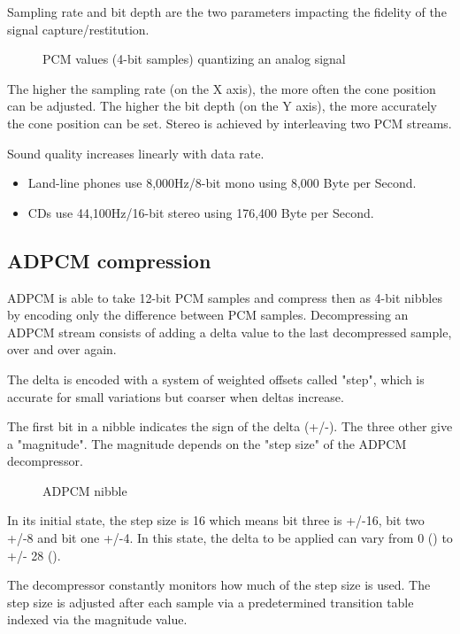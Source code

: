 Sampling rate and bit depth are the two parameters impacting the fidelity of the signal capture/restitution.

\begin{figure}[H]
\caption*{PCM values (4-bit samples) quantizing an analog signal}
\end{figure}


The higher the sampling rate (on the X axis), the more often the cone position can be adjusted. The higher the bit depth (on the Y axis), the more accurately the cone position can be set. Stereo is achieved by interleaving two PCM streams.





Sound quality increases linearly with data rate.
\begin{itemize}[topsep=0pt]
\item Land-line phones use 8,000Hz/8-bit mono using 8,000 Byte per Second.
\item CDs use 44,100Hz/16-bit stereo using 176,400 Byte per Second.
\end{itemize}



\subsection{ADPCM compression}
ADPCM is able to take 12-bit PCM samples and compress then as 4-bit nibbles by encoding only the difference between PCM samples. Decompressing an ADPCM stream consists of adding a delta value to the last decompressed  sample, over and over again.

The delta is encoded with a system of weighted offsets called "step", which is accurate for small variations but coarser when deltas increase. 

The first bit in a nibble indicates the sign of the delta (+/-). The three other give a "magnitude". The magnitude depends on the "step size" of the ADPCM decompressor.

\begin{figure}[H]
\caption*{ADPCM nibble}
\end{figure}


In its initial state, the step size is 16 which means bit three is +/-16, bit two +/-8 and bit one +/-4. In this state, the delta to be applied can vary from 0 () to +/- 28 (). 

The decompressor constantly monitors how much of the step size is used. The step size is adjusted after each sample via a  predetermined transition table indexed via the magnitude value. 

